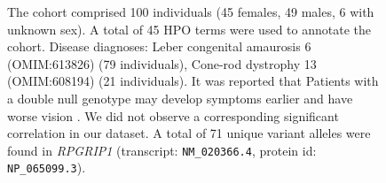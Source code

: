 \begin{figure}[htbp]
\vspace{0.2em}

\caption{ The cohort comprised 100 individuals (45 females, 49 males, 6 with unknown sex). A total of 45 HPO terms were used to annotate the cohort. Disease diagnoses: Leber congenital amaurosis 6 (OMIM:613826) (79 individuals), Cone-rod dystrophy 13 (OMIM:608194) (21 individuals). It was reported that Patients with a double null genotype may develop 
symptoms earlier and have worse vision \cite{PMID_38768745}. We did not observe a corresponding significant correlation in our dataset. A total of 71 unique variant alleles were found in \textit{RPGRIP1} (transcript: \texttt{NM\_020366.4}, protein id: \texttt{NP\_065099.3}).}
\end{figure}
